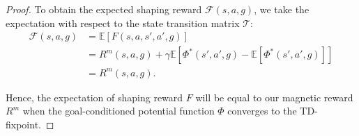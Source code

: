 \documentclass[journal]{IEEEtran}
\begin{document}
\begin{proof}
    To obtain the expected shaping reward $\mathcal{F}(s,a,g)$, we take the expectation with respect to the state transition matrix $\mathcal{T}$:
    \begin{align}
        \mathcal{F}(s,a,g) &= \mathbb{E}[F(s,a,s',a',g)] \nonumber\\
        &= R^{m}(s,a,g) \! + \! \gamma\mathbb{E}\left[\Phi^{*}(s',a',g) \! - \! \mathbb{E}[\Phi^{*}(s',a',g)]\right] \nonumber\\
        &= R^{m}(s,a,g).
    \end{align}
    
    Hence, the expectation of shaping reward $F$ will be equal to our magnetic reward $R^{m}$ when the goal-conditioned potential function $\Phi$ converges to the TD-fixpoint.
\end{proof}
\end{document}
